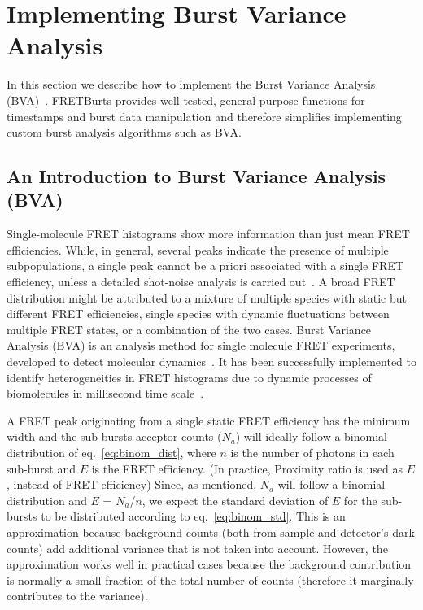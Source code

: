 \section{Implementing Burst Variance Analysis}
\label{sec:bva}
In this section we describe how to implement the Burst Variance Analysis (BVA)~\cite{Torella_2011}.
FRETBurts provides well-tested, general-purpose functions for timestamps and burst data 
manipulation and therefore simplifies implementing custom burst analysis algorithms such as BVA.

\subsection{An Introduction to Burst Variance Analysis (BVA)}
Single-molecule FRET histograms show more information than just mean FRET efficiencies. 
While, in general, several peaks indicate the presence of multiple subpopulations, 
a single peak cannot be a priori associated with a single FRET efficiency,
unless a detailed shot-noise analysis is carried out~\cite{Nir_2006,Antonik2006}.
A broad FRET distribution might be attributed to a mixture of multiple species with static but different FRET efficiencies, single species with dynamic fluctuations between multiple FRET states, or a combination of the two cases. Burst Variance Analysis (BVA) is an analysis method for single molecule FRET experiments, developed to detect molecular dynamics~\cite{Torella_2011}. It has been successfully implemented to identify heterogeneities in FRET histograms due to dynamic processes of biomolecules in millisecond time scale~\cite{Torella_2011, Robb_2013}.

A FRET peak originating from a single static FRET efficiency has the minimum width and 
the sub-bursts acceptor counts ($N_a$) will ideally follow a binomial distribution of 
eq.~\ref{eq:binom_dist}, where $n$ is the number of photons in each sub-burst and 
$E$ is the FRET efficiency. (In practice, Proximity ratio is used as $E$, instead of FRET efficiency) Since, as mentioned, $N_a$ will follow a binomial distribution and $E$ = $N_a$/$n$, we expect the standard deviation of $E$ for the sub-bursts to be distributed according to eq.~\ref{eq:binom_std}. This is an approximation because background counts (both from sample and detector's dark counts) add additional variance that is not taken into account. However, the approximation works well in practical cases because the background contribution
is normally a small fraction of the total number of counts (therefore it marginally contributes to the variance).


